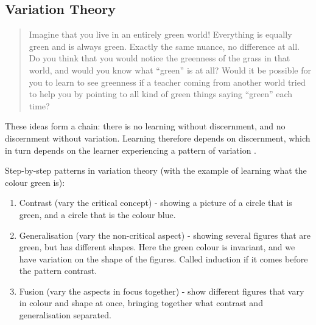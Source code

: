 \subsection{Variation Theory}

\begin{frame}
  \blockcquote[p.~44]{NCOL}{%
    Imagine that you live in an entirely green world!
    Everything is equally green and is always green.
    Exactly the same nuance, no difference at all.
    Do you think that you would notice the greenness of the grass in that 
    world, and would you know what \enquote{green} is at all?
    \textelp{}
    Would it be possible for you to learn to see greenness if a teacher coming 
    from another world tried to help you by pointing to all kind of green 
    things \textelp{} saying \enquote{green} each time?%
  }
\end{frame}

These ideas form a chain: there is no learning without discernment, and no
discernment without variation. Learning therefore depends on discernment, which
in turn depends on the learner experiencing a pattern of variation
\autocite{NCOL,VariationTheory}.


Step-by-step patterns in variation theory (with the example of learning 
what the colour green is):

\begin{enumerate}
    \item Contrast (vary the critical concept) - showing a picture of a 
circle that is green, and a circle that is the colour blue.
    \item Generalisation (vary the non-critical aspect) - showing several 
figures that are green, but has different shapes. Here the green colour
is invariant, and we have variation on the shape of the figures.
Called induction if it comes before the pattern contrast.
    \item Fusion (vary the aspects in focus together) - show
different figures that vary in colour and shape at once, bringing
together what contrast and generalisation separated.
\end{enumerate}

